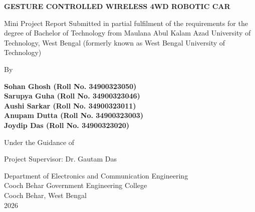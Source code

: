 \documentclass[12pt,a4paper,oneside]{report}
\begin{document}
\begin{titlepage}
\centering
{}
\vspace*{0.5in}
{\fontsize{28}{34}\selectfont\bfseries GESTURE CONTROLLED WIRELESS 4WD ROBOTIC CAR\par}
\vspace{0.8in}
{\fontsize{14}{18}\selectfont Mini Project Report Submitted in partial fulfilment of the requirements for the degree of Bachelor of Technology from Maulana Abul Kalam Azad University of Technology, West Bengal (formerly known as West Bengal University of Technology)\par}
\vspace{0.8in}
{\fontsize{14}{18}\selectfont By\par}
\vspace{0.2in}
{\fontsize{13}{17}\selectfont\bfseries
Sohan Ghosh (Roll No. 34900323050)\\
Sarupya Guha (Roll No. 34900323046)\\
Aushi Sarkar (Roll No. 34900323011)\\
Anupam Dutta (Roll No. 34900323003)\\
Joydip Das (Roll No. 34900323020)\par}
\vspace{0.5in}
{\fontsize{14}{18}\selectfont Under the Guidance of\par}
\vspace{0.2in}
{\fontsize{16}{20}\selectfont Project Supervisor: Dr. Gautam Das\par}
\vfill
{\fontsize{14}{18}\selectfont Department of Electronics and Communication Engineering \\ Cooch Behar Government Engineering College \\ Cooch Behar, West Bengal \\ 2026\par}
\vspace*{0.2in}
\end{titlepage}


\newpage
\end{document}

